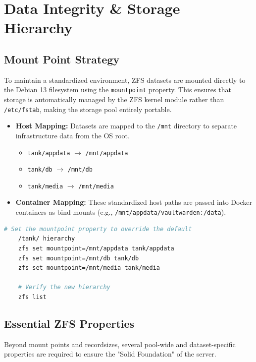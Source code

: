 \chapter{Data Integrity \& Storage Hierarchy}\label{chap:storage}
\section{Mount Point Strategy}
To maintain a standardized environment, ZFS datasets are mounted directly to the Debian 13 filesystem using the \texttt{mountpoint} property. This ensures that storage is automatically managed by the ZFS kernel module rather than \texttt{/etc/fstab}, making the storage pool entirely portable.

\begin{itemize}
	\item \textbf{Host Mapping:} Datasets are mapped to the \texttt{/mnt} directory to separate infrastructure data from the OS root.
	\begin{itemize}
		\item \texttt{tank/appdata} $\rightarrow$ \texttt{/mnt/appdata}
		\item \texttt{tank/db} $\rightarrow$ \texttt{/mnt/db}
		\item \texttt{tank/media} $\rightarrow$ \texttt{/mnt/media}
	\end{itemize}
	\item \textbf{Container Mapping:} These standardized host paths are passed into Docker containers as bind-mounts (e.g., \texttt{/mnt/appdata/vaultwarden:/data}).
\end{itemize}


\begin{lstlisting}[language=bash, caption=Applying Professional Mount Points]
	# Set the mountpoint property to override the default
	/tank/ hierarchy
	zfs set mountpoint=/mnt/appdata tank/appdata
	zfs set mountpoint=/mnt/db tank/db
	zfs set mountpoint=/mnt/media tank/media
	
	# Verify the new hierarchy
	zfs list
\end{lstlisting}

\section{Essential ZFS Properties}
Beyond mount points and recordsizes, several pool-wide and dataset-specific properties are required to ensure the "Solid Foundation" of the server.

